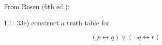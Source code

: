 \documentclass[11pt]{article}
\begin{document}
From Rosen (6th ed.):

1.1: 33e) construct a truth table for

\[
(p \leftrightarrow q) \vee (\neg q \leftrightarrow r)
\]
\end{document}
